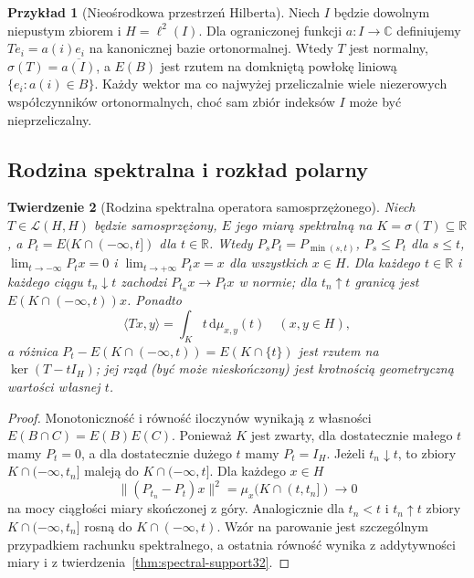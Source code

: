 \documentclass[11pt,a4paper]{article}
\numberwithin{equation}{section}
\theoremstyle{plain}
\newtheorem{twierdzenie}{Twierdzenie}[section]
\theoremstyle{definition}
\newtheorem{przyklad}[twierdzenie]{Przykład}
\theoremstyle{remark}
\newcommand{\R}{\mathbb R}
\newcommand{\C}{\mathbb C}
\begin{document}
\begin{przyklad}[Nieośrodkowa przestrzeń Hilberta]
\label{ex:nonsep-spectrum32}
Niech $I$ będzie dowolnym niepustym zbiorem i $H=\ell^2(I)$.
Dla ograniczonej funkcji $a:I\to\C$ definiujemy
$Te_i=a(i)e_i$ na kanonicznej bazie ortonormalnej.
Wtedy $T$ jest normalny, $\sigma(T)=\overline{a(I)}$,
a $E(B)$ jest rzutem na domkniętą powłokę liniową
$\{e_i:a(i)\in B\}$. Każdy wektor ma co najwyżej
przeliczalnie wiele niezerowych współczynników ortonormalnych,
choć sam zbiór indeksów $I$ może być nieprzeliczalny.
\end{przyklad}

\subsection{Rodzina spektralna i rozkład polarny}

\begin{twierdzenie}[Rodzina spektralna operatora samosprzężonego]
\label{thm:spectral-family32}
Niech $T\in\mathcal L(H,H)$ będzie samosprzężony, $E$ jego
miarą spektralną na $K=\sigma(T)\subseteq\R$, a
$P_t=E(K\cap(-\infty,t])$ dla $t\in\R$.
Wtedy $P_sP_t=P_{\min(s,t)}$, $P_s\le P_t$ dla $s\le t$,
$\lim_{t\to-\infty}P_tx=0$ i
$\lim_{t\to+\infty}P_tx=x$ dla wszystkich $x\in H$.
Dla każdego $t\in\R$ i każdego ciągu $t_n\downarrow t$
zachodzi $P_{t_n}x\to P_tx$ w normie; dla $t_n\uparrow t$
granicą jest $E(K\cap(-\infty,t))x$.
Ponadto
\[
 \langle Tx,y\rangle=\int_{K}t\,\mathrm d\mu_{x,y}(t)
 \quad(x,y\in H),
\]
a różnica $P_t-E(K\cap(-\infty,t))=E(K\cap\{t\})$
jest rzutem na $\ker(T-tI_H)$; jej rząd (być może
nieskończony) jest krotnością geometryczną wartości własnej $t$.
\end{twierdzenie}
\begin{proof}
Monotoniczność i równość iloczynów wynikają z własności
$E(B\cap C)=E(B)E(C)$. Ponieważ $K$ jest zwarty,
dla dostatecznie małego $t$ mamy $P_t=0$, a dla dostatecznie
dużego $t$ mamy $P_t=I_H$.
Jeżeli $t_n\downarrow t$, to zbiory $K\cap(-\infty,t_n]$
maleją do $K\cap(-\infty,t]$. Dla każdego $x\in H$
\[
 \|(P_{t_n}-P_t)x\|^2
 =\mu_x(K\cap(t,t_n])\longrightarrow0
\]
na mocy ciągłości miary skończonej z góry.
Analogicznie dla $t_n<t$ i $t_n\uparrow t$ zbiory
$K\cap(-\infty,t_n]$ rosną do $K\cap(-\infty,t)$.
Wzór na parowanie jest szczególnym przypadkiem
rachunku spektralnego, a ostatnia równość wynika
z addytywności miary i z twierdzenia~\ref{thm:spectral-support32}.
\end{proof}
\end{document}
